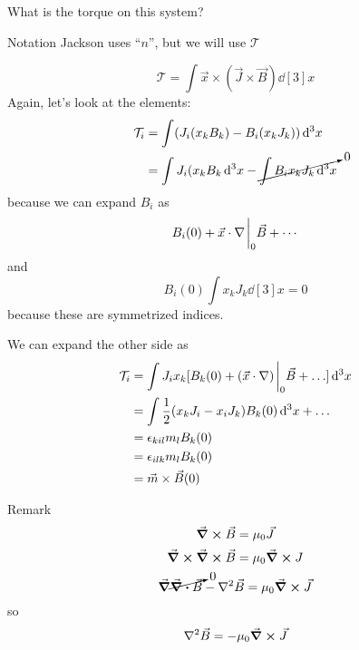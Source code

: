 \documentclass[a4paper,twoside,master.tex]{subfiles}
\begin{document}
What is the torque on this system?
\begin{note}{Notation}
    Jackson uses ``$ n $'', but we will use $ \mathcal{T} $
\end{note}
\begin{equation}
    \mathcal{T} = \int \vec{x} \times ( \vec{J} \times \vec{B}) \dd[3]{x}
\end{equation}
Again, let's look at the elements:
\begin{align}
    \mathcal{T}_i &= \int (J_i(x_kB_k)-B_i(x_kJ_k)) \dd[3]{x}\\
    &= \int J_i(x_kB_k \dd[3]{x} - \cancelto{0}{\int B_i x_k J_k \dd[3]{x}}
\end{align}
because we can expand $ B_i $ as
\begin{equation}
    B_i(0) + \vec{x} \cdot \nabla\eval_0 \vec{B} + \cdots
\end{equation}
and
\begin{equation}
    B_i(0) \int x_k J_k \dd[3]{x} = 0
\end{equation}
because these are symmetrized indices.

We can expand the other side as
\begin{align}
    \mathcal{T}_i &= \int J_i x_k [B_k(0) + ( \vec{x} \cdot \nabla)\eval_0 \vec{B} +\ldots] \dd[3]{x}\\
    &= \int \frac{1}{2} (x_k J_i - x_iJ_k)B_k(0) \dd[3]{x} + \ldots\\
    &= \epsilon_{kil} m_l B_k(0)\\
    &= \epsilon_{ilk} m_l B_k(0)\\
    &= \vec{m} \times \vec{B}(0)
\end{align}

\begin{note}{Remark}
    \begin{equation}
        \curl{ \vec{B}} = \mu_0 \vec{J}
    \end{equation}
    \begin{equation}
        \curl{ \curl{ \vec{B}}} = \mu_0 \curl{J}
    \end{equation}
    \begin{equation}
        \grad{\cancelto{0}{\div{ \vec{B}}}} - \laplacian{ \vec{B}} = \mu_0 \curl{ \vec{J}}
    \end{equation}
    so
    \begin{equation}
        \laplacian{ \vec{B}} = - \mu_0 \curl{ \vec{J}}
    \end{equation}
\end{note}
\end{document}

